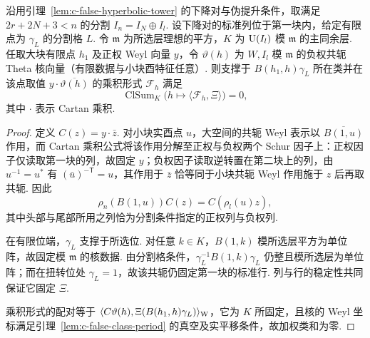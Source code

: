 \begin{lemma}
\label{lem:c-false-divided-period}
\emitthmsource
沿用引理~\ref{lem:c-false-hyperbolic-tower} 的下降对与伪提升条件，取满足 $2r+2N+3<n$ 的分割 $I_n=I_N\oplus I_l$. 设下降对的标准列位于第一块内，给定有限点为 $\gamma_L$ 的分割格 $L$. 令 $\mathfrak m$ 为所选层理想的平方，$K$ 为 $\operatorname{U}(I_l)$ 模 $\mathfrak m$ 的主同余层. 任取大块有限点 $h_1$ 及正权 Weyl 向量 $y$，令 $\vartheta(h)$ 为 $W,I_l$ 模 $\mathfrak m$ 的负权共轭 Theta 核向量（有限数据与小块酉特征任意）. 则支撑于 $B(h_1,h)\gamma_L$ 所在类并在该点取值 $y\cdot\overline{\vartheta(h)}$ 的乘积形式 $\mathcal F_h$ 满足
\[
    \operatorname{ClSum}_K\bigl(h\mapsto
             \langle\mathcal F_h,\Xi\rangle\bigr)=0 ,
\]
其中 $\cdot$ 表示 Cartan 乘积.
\end{lemma}

\begin{proof}
定义 $C(z)=y\cdot\bar z$. 对小块实酉点 $u$，大空间的共轭 Weyl 表示以 $\overline{B(1,u)}$ 作用，而 Cartan 乘积公式将该作用分解至正权与负权两个 Schur 因子上：正权因子仅读取第一块的列，故固定 $y$；负权因子读取逆转置在第二块上的列，由 $u^{-1}=u^*$ 有 $(\bar u)^{-\mathsf T}=u$，其作用于 $\bar z$ 恰等同于小块共轭 Weyl 作用施于 $z$ 后再取共轭. 因此
\[
     \rho_n(B(1,u))C(z)=C(\rho_l(u)z),
\]
其中头部与尾部所用之列恰为分割条件指定的正权列与负权列.

在有限位端，$\gamma_L$ 支撑于所选位. 对任意 $k\in K$，$B(1,k)$ 模所选层平方为单位阵，故固定模 $\mathfrak m$ 的核数据. 由分割格条件，$\gamma_L^{-1}B(1,k)\gamma_L$ 仍整且模所选层为单位阵；而在扭转位处 $\gamma_L=1$，故该共轭仍固定第一块的标准行. 列与行的稳定性共同保证它固定 $\Xi$.

乘积形式的配对等于 $\langle C\vartheta(h),\Xi(B(h_1,h)\gamma_L)\rangle_{\rm W}$，它为 $K$ 所固定，且核的 Weyl 坐标满足引理~\ref{lem:c-false-class-period} 的真空及实平移条件，故加权类和为零.
\end{proof}

